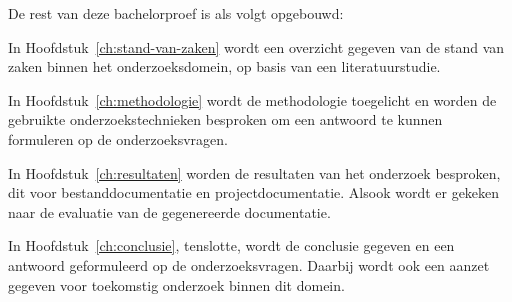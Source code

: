 
De rest van deze bachelorproef is als volgt opgebouwd:

In Hoofdstuk~\ref{ch:stand-van-zaken} wordt een overzicht gegeven van de stand van zaken binnen het onderzoeksdomein, op basis van een literatuurstudie.

In Hoofdstuk~\ref{ch:methodologie} wordt de methodologie toegelicht en worden de gebruikte onderzoekstechnieken besproken om een antwoord te kunnen formuleren op de onderzoeksvragen.


In Hoofdstuk~\ref{ch:resultaten} worden de resultaten van het onderzoek besproken, dit voor bestanddocumentatie en projectdocumentatie.
Alsook wordt er gekeken naar de evaluatie van de gegenereerde documentatie.

In Hoofdstuk~\ref{ch:conclusie}, tenslotte, wordt de conclusie gegeven en een antwoord geformuleerd op de onderzoeksvragen. Daarbij wordt ook een aanzet gegeven voor toekomstig onderzoek binnen dit domein.